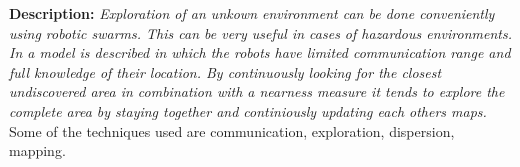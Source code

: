 
\textbf{Description: }\emph{Exploration of an unkown environment can be done conveniently using robotic swarms. This can be very useful in cases of hazardous environments. In \cite{sheng2006distributed} a model is described in which the robots have limited communication range and full knowledge of their location. By continuously looking for the closest undiscovered area in combination with a nearness measure it tends to explore the complete area by staying together and continiously updating each others maps.}
 Some of the techniques used are communication, exploration, dispersion, mapping. \cite{sheng2006distributed} 